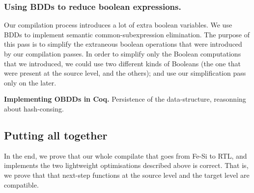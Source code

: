 \documentclass{llncs}
\begin{document}

\subsubsection{Using BDDs to reduce boolean expressions.}
Our compilation process introduces a lot of extra boolean
variables. We use BDDs to implement semantic common-subexpression
elimination. The purpose of this pass is to simplify the extraneous
boolean operations that were introduced by our compilation passes. In
order to simplify only the Boolean computations that we introduced, we
could use two different kinds of Booleans (the one that were present
at the source level, and the others); and use our simplification pass
only on the later. 

\textbf{Implementing OBDDs in Coq.} 
Persistence of the data-structure, reasonning about hash-consing.

\subsection{Putting all together}
In the end, we prove that our whole compilate that goes from Fe-Si to
RTL, and implements the two lightweight optimisations described above
is correct. That is, we prove that that next-step functions at the
source level and the target level are compatible.
\end{document}
